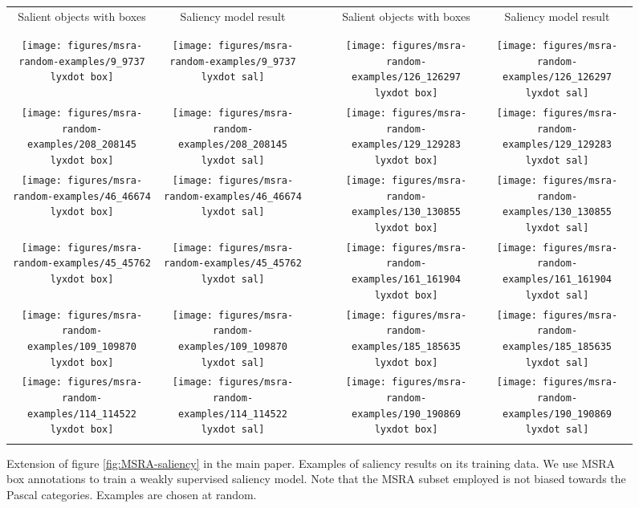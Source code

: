\documentclass[british,10pt,twocolumn,letterpaper]{article}
\providecommand{\tabularnewline}{\\}
\newcommand{\lyxdot}{.}
\begin{document}
\begin{figure*}
\begin{centering}
\begin{tabular}{ccc|ccc}
Salient objects with boxes & Saliency model result &  &  & Salient objects with boxes & Saliency model result\tabularnewline
 &  &  &  &  & \tabularnewline
 &  &  &  &  & \tabularnewline
\texttt{[image: figures/msra-random-examples/9\_9737\\lyxdot box]} & \texttt{[image: figures/msra-random-examples/9\_9737\\lyxdot sal]} &  &  & \texttt{[image: figures/msra-random-examples/126\_126297\\lyxdot box]} & \texttt{[image: figures/msra-random-examples/126\_126297\\lyxdot sal]}\tabularnewline
\texttt{[image: figures/msra-random-examples/208\_208145\\lyxdot box]} & \texttt{[image: figures/msra-random-examples/208\_208145\\lyxdot sal]} &  &  & \texttt{[image: figures/msra-random-examples/129\_129283\\lyxdot box]} & \texttt{[image: figures/msra-random-examples/129\_129283\\lyxdot sal]}\tabularnewline
\texttt{[image: figures/msra-random-examples/46\_46674\\lyxdot box]} & \texttt{[image: figures/msra-random-examples/46\_46674\\lyxdot sal]} &  &  & \texttt{[image: figures/msra-random-examples/130\_130855\\lyxdot box]} & \texttt{[image: figures/msra-random-examples/130\_130855\\lyxdot sal]}\tabularnewline
\texttt{[image: figures/msra-random-examples/45\_45762\\lyxdot box]} & \texttt{[image: figures/msra-random-examples/45\_45762\\lyxdot sal]} &  &  & \texttt{[image: figures/msra-random-examples/161\_161904\\lyxdot box]} & \texttt{[image: figures/msra-random-examples/161\_161904\\lyxdot sal]}\tabularnewline
\texttt{[image: figures/msra-random-examples/109\_109870\\lyxdot box]} & \texttt{[image: figures/msra-random-examples/109\_109870\\lyxdot sal]} &  &  & \texttt{[image: figures/msra-random-examples/185\_185635\\lyxdot box]} & \texttt{[image: figures/msra-random-examples/185\_185635\\lyxdot sal]}\tabularnewline
\texttt{[image: figures/msra-random-examples/114\_114522\\lyxdot box]} & \texttt{[image: figures/msra-random-examples/114\_114522\\lyxdot sal]} &  &  & \texttt{[image: figures/msra-random-examples/190\_190869\\lyxdot box]} & \texttt{[image: figures/msra-random-examples/190\_190869\\lyxdot sal]}\tabularnewline
 &  & \multicolumn{1}{c}{} &  &  & \tabularnewline
\end{tabular}
\par\end{centering}
\caption{\label{fig:MSRA-saliency-1}Extension of figure \ref{fig:MSRA-saliency} in the main paper.
Examples of saliency results on its training data. We use MSRA box
annotations to train a weakly supervised saliency model. Note that
the MSRA subset employed is not biased towards the Pascal categories.
Examples are chosen at random.}
\end{figure*}
\end{document}
